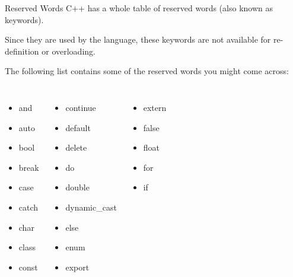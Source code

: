 \documentclass[../lecture2-variables.tex]{subfiles}
\begin{document}
\begin{frame}[fragile]{Reserved Words}
    C++ has a whole table of reserved words (also known as keywords). \newline

    Since they are used by the language, these keywords are not available for
    re-definition or overloading. \newline \newline

    The following list contains some of the reserved words you might come across:
    \begin{columns} %
            \begin{itemize}
                \item and
                \item auto
                \item bool
                \item break
                \item case
                \item catch
                \item char
                \item class
                \item const
            \end{itemize}
            \begin{itemize}
                \item continue
                \item default
                \item delete
                \item do
                \item double
                \item dynamic_cast
                \item else
                \item enum
                \item export
            \end{itemize}
            \begin{itemize}
                \item extern
                \item false
                \item float
                \item for
                \item if

\end{itemize}
\end{columns}
\end{frame}
\end{document}
